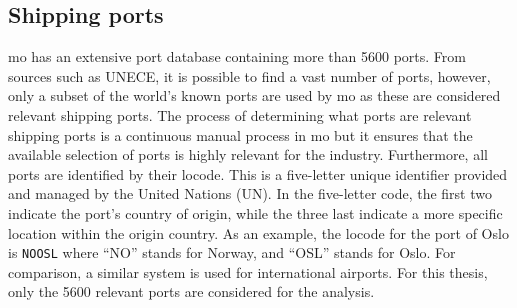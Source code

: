 \subsection{Shipping ports}
\label{sec:shipping_ports}

\acrshort{mo} has an extensive port database containing more than 5600 ports. From sources such as UNECE, it is possible to find a vast number of ports, however, only a subset of the world's known ports are used by \acrshort{mo} as these are considered relevant shipping ports. The process of determining what ports are relevant shipping ports is a continuous manual process in \acrshort{mo} but it ensures that the available selection of ports is highly relevant for the industry. Furthermore, all ports are identified by their \gls{locode}. This is a five-letter unique identifier provided and managed by the United Nations (UN). In the five-letter code, the first two indicate the port's country of origin, while the three last indicate a more specific location within the origin country. As an example, the \gls{locode} for the port of Oslo is \texttt{NOOSL} where ``NO'' stands for Norway, and ``OSL'' stands for Oslo. For comparison, a similar system is used for international airports. For this thesis, only the 5600 relevant ports are considered for the analysis.
